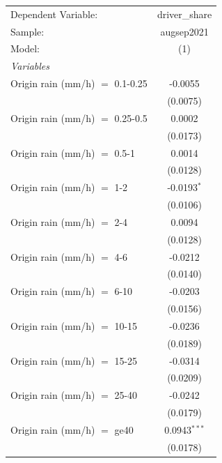 \ifdefined\ifclassloaded
{}
\fi

\begingroup
\centering
\begin{tabular}{lc}
   \tabularnewline \midrule \midrule
   Dependent Variable:             & driver\_share\\   
   Sample:                         & augsep2021 \\   
   Model:                          & (1)\\  
   \midrule
   \emph{Variables}\\
   Origin rain (mm/h) $=$ 0.1-0.25 & -0.0055\\   
                                   & (0.0075)\\   
   Origin rain (mm/h) $=$ 0.25-0.5 & 0.0002\\   
                                   & (0.0173)\\   
   Origin rain (mm/h) $=$ 0.5-1    & 0.0014\\   
                                   & (0.0128)\\   
   Origin rain (mm/h) $=$ 1-2      & -0.0193$^{*}$\\   
                                   & (0.0106)\\   
   Origin rain (mm/h) $=$ 2-4      & 0.0094\\   
                                   & (0.0128)\\   
   Origin rain (mm/h) $=$ 4-6      & -0.0212\\   
                                   & (0.0140)\\   
   Origin rain (mm/h) $=$ 6-10     & -0.0203\\   
                                   & (0.0156)\\   
   Origin rain (mm/h) $=$ 10-15    & -0.0236\\   
                                   & (0.0189)\\   
   Origin rain (mm/h) $=$ 15-25    & -0.0314\\   
                                   & (0.0209)\\   
   Origin rain (mm/h) $=$ 25-40    & -0.0242\\   
                                   & (0.0179)\\   
   Origin rain (mm/h) $=$ ge40     & 0.0943$^{***}$\\   
                                   & (0.0178)\\   

\end{tabular}

